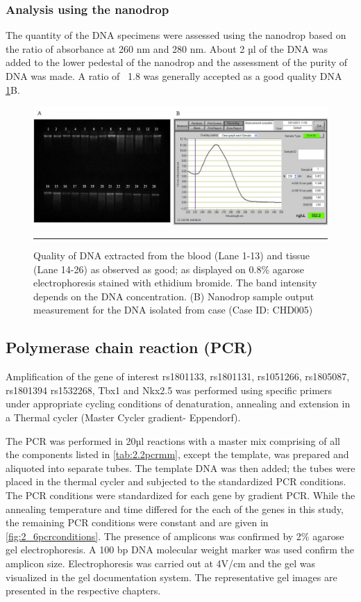\subsubsection{Analysis using the nanodrop} 
The quantity of the DNA specimens were assessed using the nanodrop based on the ratio of absorbance at 260 nm and 280 nm. About 2 µl of the DNA was added to the lower pedestal of the nanodrop and the assessment of the purity of DNA was made. A ratio of ~1.8 was generally accepted as a good quality DNA \cref{fig:2_5DNAqlty}B.

\begin{figure}[!tb]
\centering
\includegraphics[width=\linewidth]{Figures/2_5DNAqlty.pdf} 
\rule{35em}{0.5pt}
\caption{Quality of DNA extracted from the blood (Lane 1-13) and tissue (Lane 14-26)  as observed as good; as displayed on 0.8\% agarose electrophoresis stained with ethidium bromide. The band intensity depends on the DNA concentration. (B) Nanodrop sample output measurement for the DNA isolated from case (Case ID: CHD005)}
\label{fig:2_5DNAqlty}
\end{figure}

\subsection{Polymerase chain reaction (PCR)}
Amplification of the gene of interest rs1801133, rs1801131, rs1051266, rs1805087, rs1801394  rs1532268, Tbx1 and Nkx2.5 was performed using specific primers under appropriate cycling conditions of denaturation, annealing and extension in a Thermal cycler (Master Cycler gradient- Eppendorf).

The PCR was performed in 20µl reactions with a master mix comprising of all the components listed in \cref{tab:2.2pcrmm}, except the template, was prepared and aliquoted into separate tubes. The template DNA was then added; the tubes were placed in the thermal cycler and subjected to the standardized PCR conditions. The PCR conditions were standardized for each gene by gradient PCR. While the annealing temperature and time differed for the each of the genes in this study, the remaining PCR conditions were constant and are given in \cref{fig:2_6pcrconditions}. The presence of amplicons was confirmed by 2\% agarose gel electrophoresis. A 100 bp DNA molecular weight marker was used confirm the amplicon size. Electrophoresis was carried out at 4V/cm and the gel was visualized in the gel documentation system. The representative gel images are presented in the respective chapters.

